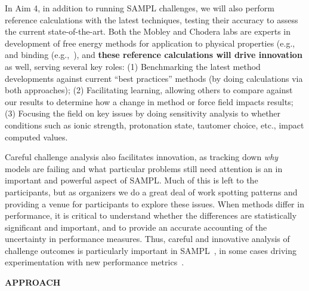 \documentclass[11pt]{article}
\begin{document}
In Aim 4, in addition to running SAMPL challenges, we will also perform reference calculations with the latest techniques, testing their accuracy to assess the current state-of-the-art.
Both the Mobley and Chodera labs are experts in development of free energy methods for application to physical properties (e.g., ~\cite{mobley_blind_2014-1, Beauchamp:2015:JournalofPhysicalChemistryB, bannan_calculating_2016} and binding (e.g.,~\cite{rocklin_blind_2013, lim_sensitivity_2016, wang_identifying_2013}), and \textbf{these reference calculations will drive innovation} as well, serving several key roles: (1) Benchmarking the latest method developments against current ``best practices'' methods (by doing calculations via both approaches); (2) Facilitating learning, allowing others to compare against our results to determine how a change in method or force field impacts results; (3) Focusing the field on key issues by doing sensitivity analysis to whether conditions such as ionic strength, protonation state, tautomer choice, etc., impact computed values.

Careful challenge analysis also facilitates innovation, as tracking down \emph{why} models are failing and what particular problems still need attention is an in important and powerful aspect of SAMPL.
Much of this is left to the participants, but as organizers we do a great deal of work spotting patterns and providing a venue for participants to explore these issues.
When methods differ in performance, it is critical to understand whether the differences are statistically significant and important, and to provide an accurate accounting of the uncertainty in performance measures. 
Thus, careful and innovative analysis of challenge outcomes is particularly important in SAMPL~\cite{mobley_blind_2014-1, bannan_blind_2016, yin_overview_2016}, in some cases driving experimentation with new performance metrics~\cite{mobley_blind_2014-1}.




{\large \bf APPROACH}
\end{document}
